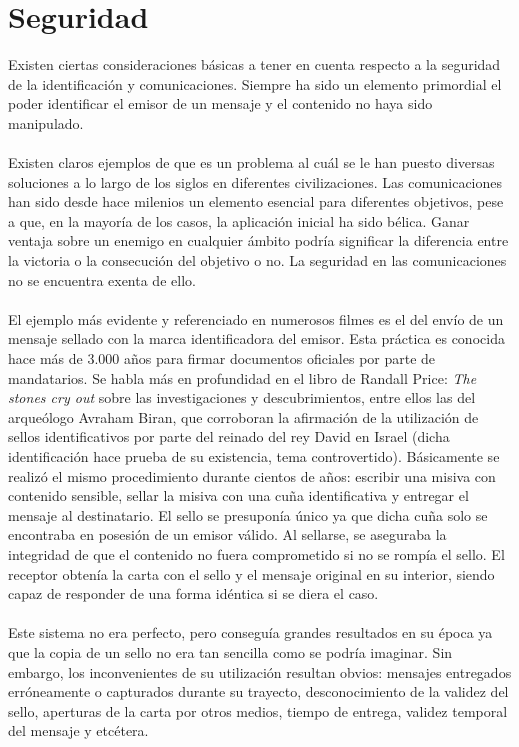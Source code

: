 \documentclass[../PFC.tex]{subfiles}
\begin{document}
\section{Seguridad}
\label{Seguridad}

Existen ciertas consideraciones básicas a tener en cuenta respecto a la seguridad de la identificación y comunicaciones. Siempre ha sido un elemento primordial el poder identificar el emisor de un mensaje y el contenido no haya sido manipulado. 
\\\\
Existen claros ejemplos de que es un problema al cuál se le han puesto diversas soluciones a lo largo de los siglos en diferentes civilizaciones. Las comunicaciones han sido desde hace milenios un elemento esencial para diferentes objetivos, pese a que, en la mayoría de los casos, la aplicación inicial ha sido bélica. Ganar ventaja sobre un enemigo en cualquier ámbito podría significar la diferencia entre la victoria o la consecución del objetivo o no. La seguridad en las comunicaciones no se encuentra exenta de ello. 
\\\\
El ejemplo más evidente y referenciado en numerosos filmes es el del envío de un mensaje sellado con la marca identificadora del emisor. Esta práctica es conocida hace más de 3.000 años para firmar documentos oficiales por parte de mandatarios. Se habla más en profundidad en el libro de Randall Price: \textit{The stones cry out}\cite{stonesCryOut} sobre las investigaciones y descubrimientos, entre ellos las del arqueólogo Avraham Biran, que corroboran la afirmación de la utilización de sellos identificativos por parte del reinado del rey David en Israel (dicha identificación hace prueba de su existencia, tema controvertido). Básicamente se realizó el mismo procedimiento durante cientos de años: escribir una misiva con contenido sensible, sellar la misiva con una cuña identificativa y entregar el mensaje al destinatario. El sello se presuponía único ya que dicha cuña solo se encontraba en posesión de un emisor válido. Al sellarse, se aseguraba la integridad de que el contenido no fuera comprometido si no se rompía el sello. El receptor obtenía la carta con el sello y el mensaje original en su interior, siendo capaz de responder de una forma idéntica si se diera el caso.
\\\\
Este sistema no era perfecto, pero conseguía grandes resultados en su época ya que la copia de un sello no era tan sencilla como se podría imaginar. Sin embargo, los inconvenientes de su utilización resultan obvios: mensajes entregados erróneamente o capturados durante su trayecto, desconocimiento de la validez del sello, aperturas de la carta por otros medios, tiempo de entrega, validez temporal del mensaje y etcétera.
\end{document}
